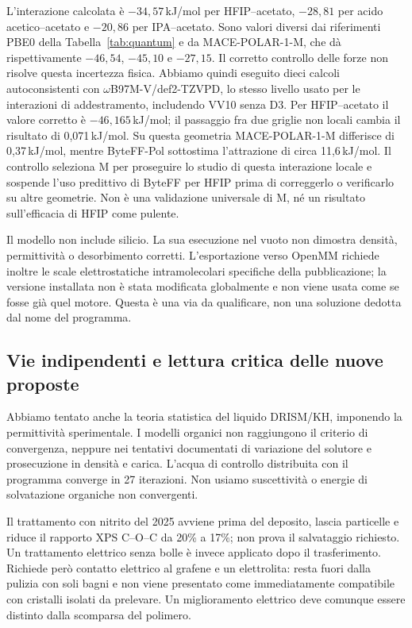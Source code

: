 \documentclass[11pt,reqno]{amsart}
\numberwithin{equation}{section}
\begin{document}
L'interazione calcolata \`e $-34,57$\,kJ/mol per HFIP--acetato,
$-28,81$ per acido acetico--acetato e $-20,86$ per IPA--acetato.
Sono valori diversi dai riferimenti PBE0 della Tabella~\ref{tab:quantum}
e da MACE-POLAR-1-M, che d\`a rispettivamente $-46,54$, $-45,10$
e $-27,15$. Il corretto controllo delle forze non risolve
questa incertezza fisica. Abbiamo quindi eseguito dieci calcoli
autoconsistenti con $\omega$B97M-V/def2-TZVPD, lo stesso livello
usato per le interazioni di addestramento, includendo VV10 senza D3.
Per HFIP--acetato il valore corretto \`e $-46,165$\,kJ/mol;
il passaggio fra due griglie non locali cambia il risultato
di 0,071\,kJ/mol. Su questa geometria MACE-POLAR-1-M differisce
di 0,37\,kJ/mol, mentre ByteFF-Pol sottostima l'attrazione
di circa 11,6\,kJ/mol. Il controllo seleziona M per proseguire
lo studio di questa interazione locale e sospende l'uso predittivo
di ByteFF per HFIP prima di correggerlo o verificarlo su altre
geometrie. Non \`e una validazione universale di M, n\'e
un risultato sull'efficacia di HFIP come pulente.

Il modello non include silicio. La sua esecuzione nel vuoto
non dimostra densit\`a, permittivit\`a o desorbimento corretti.
L'esportazione verso OpenMM richiede inoltre le scale elettrostatiche
intramolecolari specifiche della pubblicazione; la versione installata
non \`e stata modificata globalmente e non viene usata come
se fosse gi\`a quel motore. Questa \`e una via da qualificare,
non una soluzione dedotta dal nome del programma.

\subsection{Vie indipendenti e lettura critica delle nuove proposte}

Abbiamo tentato anche la teoria statistica del liquido DRISM/KH,
imponendo la permittivit\`a sperimentale. I modelli organici
non raggiungono il criterio di convergenza, neppure nei tentativi
documentati di variazione del solutore e prosecuzione in densit\`a
e carica. L'acqua di controllo distribuita con il programma
converge in 27 iterazioni. Non usiamo suscettivit\`a o energie
di solvatazione organiche non convergenti.

Il trattamento con nitrito del 2025 \cite{LeeNitrite2025} avviene
prima del deposito, lascia particelle e riduce il rapporto XPS
C--O--C da 20\% a 17\%; non prova il salvataggio richiesto.
Un trattamento elettrico senza bolle \cite{Park2018} \`e invece
applicato dopo il trasferimento. Richiede per\`o contatto elettrico
al grafene e un elettrolita: resta fuori dalla pulizia con soli bagni
e non viene presentato come immediatamente compatibile con
cristalli isolati da prelevare. Un miglioramento elettrico deve
comunque essere distinto dalla scomparsa del polimero.
\end{document}
